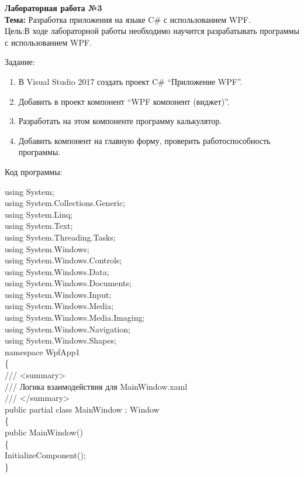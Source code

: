 
\begin{center}
\textbf{Лабораторная работа №3}
\\
\textbf{Тема:} Разработка приложения на языке C\# с использованием WPF.
\\
Цель:В ходе лабораторной работы необходимо научится разрабатывать программы с использованием WPF.  
\end{center}

Задание:
\begin{enumerate}

\item В Visual Studio 2017 создать проект C\# “Приложение WPF”.\
\item Добавить в проект компонент “WPF компонент (виджет)”.
\item Разработать на этом компоненте программу калькулятор.
\item Добавить компонент на главную форму, проверить работоспособность программы.

\end{enumerate}

Код программы:

using System;\\
using System.Collections.Generic;\\
using System.Linq;\\
using System.Text;\\
using System.Threading.Tasks;\\
using System.Windows;\\
using System.Windows.Controls;\\
using System.Windows.Data;\\
using System.Windows.Documents;\\
using System.Windows.Input;\\
using System.Windows.Media;\\
using System.Windows.Media.Imaging;\\
using System.Windows.Navigation;\\
using System.Windows.Shapes;\\

namespace WpfApp1\\
\{\\
    /// <summary>\\
    /// Логика взаимодействия для MainWindow.xaml\\
    /// </summary>\\
    public partial class MainWindow : Window\\
    \{\\
        public MainWindow()\\
        \{\\
            InitializeComponent();\\
        \}\\

